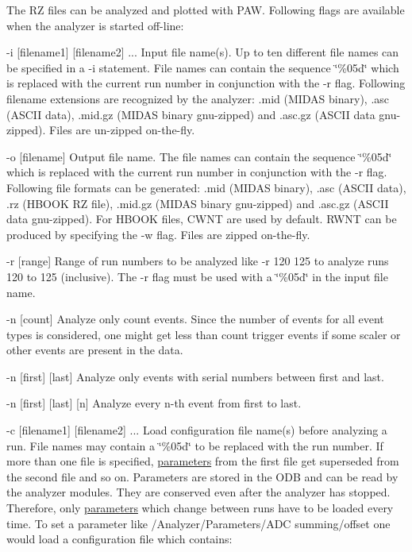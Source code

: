 The RZ files can be analyzed and plotted with PAW. Following flags are available when the analyzer is started off-\/line:
\begin{DoxyItemize}
\item -\/i \mbox{[}filename1\mbox{]} \mbox{[}filename2\mbox{]} ... Input file name(s). Up to ten different file names can be specified in a -\/i statement. File names can contain the sequence \char`\"{}\%05d\char`\"{} which is replaced with the current run number in conjunction with the -\/r flag. Following filename extensions are recognized by the analyzer: .mid (MIDAS binary), .asc (ASCII data), .mid.gz (MIDAS binary gnu-\/zipped) and .asc.gz (ASCII data gnu-\/zipped). Files are un-\/zipped on-\/the-\/fly.
\item -\/o \mbox{[}filename\mbox{]} Output file name. The file names can contain the sequence \char`\"{}\%05d\char`\"{} which is replaced with the current run number in conjunction with the -\/r flag. Following file formats can be generated: .mid (MIDAS binary), .asc (ASCII data), .rz (HBOOK RZ file), .mid.gz (MIDAS binary gnu-\/zipped) and .asc.gz (ASCII data gnu-\/zipped). For HBOOK files, CWNT are used by default. RWNT can be produced by specifying the -\/w flag. Files are zipped on-\/the-\/fly.
\item -\/r \mbox{[}range\mbox{]} Range of run numbers to be analyzed like -\/r 120 125 to analyze runs 120 to 125 (inclusive). The -\/r flag must be used with a \char`\"{}\%05d\char`\"{} in the input file name.
\item -\/n \mbox{[}count\mbox{]} Analyze only count events. Since the number of events for all event types is considered, one might get less than count trigger events if some scaler or other events are present in the data.
\item -\/n \mbox{[}first\mbox{]} \mbox{[}last\mbox{]} Analyze only events with serial numbers between first and last.
\item -\/n \mbox{[}first\mbox{]} \mbox{[}last\mbox{]} \mbox{[}n\mbox{]} Analyze every n-\/th event from first to last.
\item -\/c \mbox{[}filename1\mbox{]} \mbox{[}filename2\mbox{]} ... Load configuration file name(s) before analyzing a run. File names may contain a \char`\"{}\%05d\char`\"{} to be replaced with the run number. If more than one file is specified, \hyperlink{structparameters}{parameters} from the first file get superseded from the second file and so on. Parameters are stored in the ODB and can be read by the analyzer modules. They are conserved even after the analyzer has stopped. Therefore, only \hyperlink{structparameters}{parameters} which change between runs have to be loaded every time. To set a parameter like /Analyzer/Parameters/ADC summing/offset one would load a configuration file which contains: 

\end{DoxyItemize}
